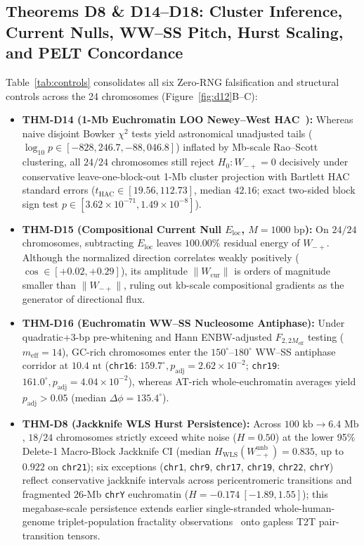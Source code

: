 \documentclass[11pt,a4paper]{article}
\newcommand{\Wmp}{W_{-+}}
\begin{document}
\subsection{Theorems D8 \& D14--D18: Cluster Inference, Current Nulls, WW--SS Pitch, Hurst Scaling, and PELT Concordance}
Table~\ref{tab:controls} consolidates all six Zero-RNG falsification and structural controls across the 24 chromosomes (Figure~\ref{fig:d12}B--C):
\begin{itemize}
  \item \textbf{THM-D14 (1-Mb Euchromatin LOO Newey--West HAC~\cite{Newey1987}):} Whereas naive disjoint Bowker $\chi^2$ tests yield astronomical unadjusted tails ($\log_{10} p \in [-828{,}246.7, -88{,}046.8]$) inflated by Mb-scale Rao--Scott clustering, all $24/24$ chromosomes still reject $H_0:\Wmp=0$ decisively under conservative leave-one-block-out 1-Mb cluster projection with Bartlett HAC standard errors ($t_{\mathrm{HAC}} \in [19.56, 112.73]$, median $42.16$; exact two-sided block sign test $p \in [3.62\times 10^{-71}, 1.49\times 10^{-8}]$).
  \item \textbf{THM-D15 (Compositional Current Null $E_{\mathrm{loc}}$, $M=1000\text{ bp}$):} On $24/24$ chromosomes, subtracting $E_{\mathrm{loc}}$ leaves $100.00\%$ residual energy of $\Wmp$. Although the normalized direction correlates weakly positively ($\cos \in [+0.02, +0.29]$), its amplitude $\|W_{\mathrm{cur}}\|$ is orders of magnitude smaller than $\|\Wmp\|$, ruling out kb-scale compositional gradients as the generator of directional flux.
  \item \textbf{THM-D16 (Euchromatin WW--SS Nucleosome Antiphase):} Under quadratic+3-bp pre-whitening and Hann ENBW-adjusted $F_{2,2M_{\mathrm{eff}}}$ testing ($m_{\mathrm{eff}}=14$), GC-rich chromosomes enter the $150^\circ$--$180^\circ$ WW--SS antiphase corridor at $10.4\text{ nt}$ (\texttt{chr16}: $159.7^\circ, p_{\mathrm{adj}}=2.62\times 10^{-2}$; \texttt{chr19}: $161.0^\circ, p_{\mathrm{adj}}=4.04\times 10^{-2}$), whereas AT-rich whole-euchromatin averages yield $p_{\mathrm{adj}}>0.05$ (median $\Delta\phi=135.4^\circ$).
  \item \textbf{THM-D8 (Jackknife WLS Hurst Persistence):} Across $100\text{ kb}\to 6.4\text{ Mb}$, $18/24$ chromosomes strictly exceed white noise ($H=0.50$) at the lower 95\% Delete-1 Macro-Block Jackknife CI (median $H_{\mathrm{WLS}}(\Wmp^{\mathrm{unb}})=0.835$, up to $0.922$ on \texttt{chr21}); six exceptions (\texttt{chr1}, \texttt{chr9}, \texttt{chr17}, \texttt{chr19}, \texttt{chr22}, \texttt{chrY}) reflect conservative jackknife intervals across pericentromeric transitions and fragmented $26\text{-Mb}$ \texttt{chrY} euchromatin ($H=-0.174\ [-1.89, 1.55]$); this megabase-scale persistence extends earlier single-stranded whole-human-genome triplet-population fractality observations~\cite{Perez2010} onto gapless T2T pair-transition tensors.

\end{itemize}
\end{document}
